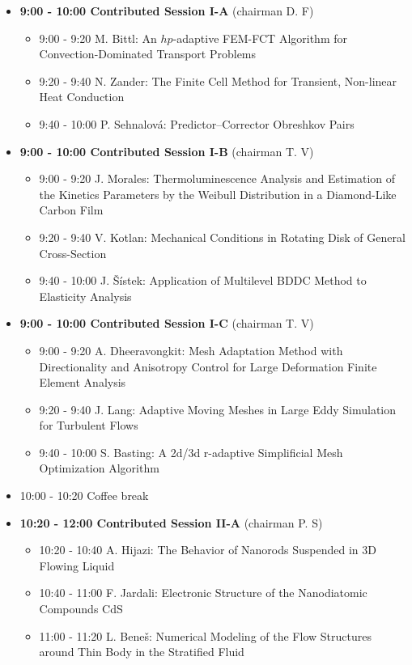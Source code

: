 \documentclass[10pt, A4]{article}%
\begin{document}
\begin{itemize}    
  \item {\bf 9:00 - 10:00 Contributed Session I-A} (chairman D. F) 
  \begin{itemize}
    \item 9:00 - 9:20 M. Bittl: An $hp$-adaptive FEM-FCT Algorithm for Convection-Dominated Transport Problems
    \item 9:20 - 9:40 N. Zander: The Finite Cell Method for Transient, Non-linear Heat Conduction
    \item 9:40 - 10:00 P. Sehnalov\'{a}: Predictor–Corrector Obreshkov Pairs
  \end{itemize}
  \item {\bf 9:00 - 10:00 Contributed Session I-B} (chairman T. V) 
  \begin{itemize}
    \item 9:00 - 9:20 J. Morales: Thermoluminescence Analysis and Estimation of the Kinetics Parameters by the Weibull Distribution in a Diamond-Like Carbon Film
    \item 9:20 - 9:40 V. Kotlan: Mechanical Conditions in Rotating Disk of General Cross-Section
    \item 9:40 - 10:00 J. \v{S}\'{i}stek: Application of Multilevel BDDC Method to Elasticity Analysis
  \end{itemize}
  \item {\bf 9:00 - 10:00 Contributed Session I-C} (chairman T. V) 
  \begin{itemize}
    \item 9:00 - 9:20 A. Dheeravongkit: Mesh Adaptation Method with Directionality and Anisotropy Control for Large Deformation Finite Element Analysis
    \item 9:20 - 9:40 J. Lang: Adaptive Moving Meshes in Large Eddy Simulation for Turbulent Flows
    \item 9:40 - 10:00 S. Basting: A 2d/3d r-adaptive Simplificial Mesh Optimization Algorithm
  \end{itemize}
  \item 10:00 - 10:20 Coffee break
  \item {\bf 10:20 - 12:00 Contributed Session II-A} (chairman P. S) 
  \begin{itemize}
    \item 10:20 - 10:40 A. Hijazi: The Behavior of Nanorods Suspended in 3D Flowing Liquid
    \item 10:40 - 11:00 F. Jardali: Electronic Structure of the Nanodiatomic Compounds CdS
    \item 11:00 - 11:20 L. Bene\v{s}: Numerical Modeling of the Flow Structures around Thin Body in the Stratified Fluid 

\end{itemize}
\end{itemize}
\end{document}

